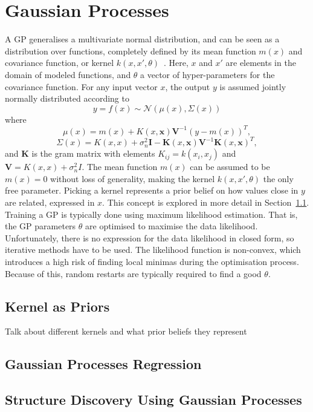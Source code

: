 \section{Gaussian Processes}
A GP generalises a multivariate normal distribution, and can be seen
as a distribution over functions, completely defined by its
mean function $m(x)$ and covariance function, or kernel $k(x, x',
\theta)$~\cite{Rasmussen-Williams-2006}. Here, $x$ and $x'$ are
elements in the domain of modeled functions, and $\theta$ a
vector of hyper-parameters for the covariance function. For any input
vector $x$, the output $y$ is assumed jointly normally distributed according to
\begin{equation}
  \label{eq:gp}
  y = f(x) \sim \mathcal{N}(\mu(x), \Sigma(x))
\end{equation}
where
\begin{equation}
  \label{eq:gp-mean-function}
  \mu(x) = m(x) + K(x, \textbf{x})\textbf{V}^{-1}{(y-m(x))}^{T},
\end{equation}
\begin{equation}
  \label{eq:gp-covariance-function}
  \Sigma(x) = K(x, x) + \sigma^{2}_n\textbf{I} - \textbf{K}(x, \textbf{x})\textbf{V}^{-1}{\textbf{K}(x, \textbf{x})}^{T},
\end{equation}
and $\textbf{K}$ is the gram matrix with elements $K_{ij} = k(x_i, x_j)$ and $\textbf{V}
= K(x, x) + \sigma_n^2I$.
The mean function $m(x)$ can be assumed to be $m(x) = 0$
without loss of generality, making the kernel $k(x, x', \theta)$
the only free parameter. Picking a kernel represents a prior
belief on how values close in $y$ are related, expressed in $x$. This
concept is explored in more detail in Section~\ref{sec:kernels-as-priors}.
Training a GP is typically done using maximum likelihood
estimation. That is, the GP parameters $\theta$ are optimised to
maximise the data likelihood. Unfortunately,
there is no expression for the data likelihood in closed form, so
iterative methods have to be used. The likelihood function is
non-convex, which introduces a high risk of finding local minimas
during the optimisation process. Because of this, random restarts are
typically required to find a good $\theta$.

\subsection{Kernel as Priors}\label{sec:kernels-as-priors}

Talk about different kernels and what prior beliefs they represent

\subsection{Gaussian Processes Regression}

\subsection{Structure Discovery Using Gaussian Processes}
